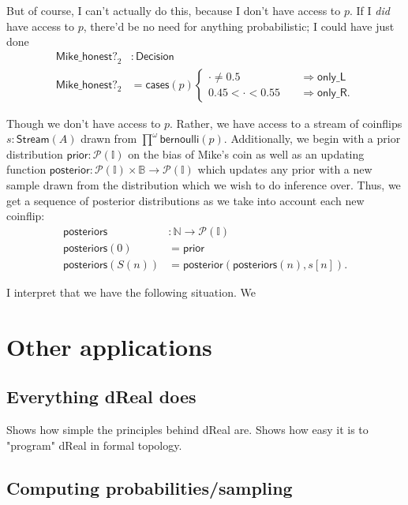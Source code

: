 \documentclass{article}           %
\newcommand{\nat}{\mathbb{N}}
\newcommand{\bool}{\mathbb{B}}
\newcommand{\Prob}{\mathcal{P}}
\begin{document}
But of course, I can't actually do this, because I don't have access to $p$. If I \emph{did} have access to $p$, there'd be no need for anything probabilistic; I could have just done
\begin{align*}
\mathsf{Mike\_honest?}_2 &: \mathsf{Decision}
\\ \mathsf{Mike\_honest?}_2 &= \mathsf{cases}(p)
\begin{cases}
\cdot \ne 0.5 
  \quad &\Longrightarrow
   \mathsf{only\_L}
\\
0.45 < \cdot < 0.55
  \quad &\Longrightarrow
   \mathsf{only\_R}.
\end{cases}
\end{align*}

Though we don't have access to $p$. Rather, we have access to a stream of coinflips $s : \mathsf{Stream}(A)$ drawn from $\prod^\omega \mathsf{bernoulli}(p)$. Additionally, we begin with a prior distribution $\mathsf{prior} : \Prob(\mathbb{I})$ on the bias of Mike's coin as well as an updating function $\mathsf{posterior} : \Prob(\mathbb{I}) \times \bool \to \Prob(\mathbb{I})$ which updates any prior with a new sample drawn from the distribution which we wish to do inference over. Thus, we get a sequence of posterior distributions as we take into account each new coinflip:
\begin{align*}
\mathsf{posteriors} &: \nat \to \Prob(\mathbb{I})
\\ \mathsf{posteriors}(0) &= \mathsf{prior}
\\ \mathsf{posteriors}(S(n)) &= \mathsf{posterior}(\mathsf{posteriors}(n), s[n]).
\end{align*}

I interpret that we have the following situation. We 

\section{Other applications}

\subsection{Everything dReal does}
Shows how simple the principles behind dReal are. Shows how easy it is to "program" dReal in formal topology. 

\subsection{Computing probabilities/sampling}
\end{document}
